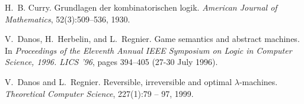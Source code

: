 \documentclass[xchauthor,chkrefs,GCNS,amsmath,amsthm,rotating,leaveRGB]{tcsg}
\theoremstyle{plain}
\theoremstyle{definition}
\begin{document}
\begin{backmatter}
\begin{thebibliography}{}
\begin{bsubitem}
\begin{bcontribution}[language=de]%
\end{bcontribution}
\begin{bhost}
\begin{bissue}
\end{bissue}
\end{bhost}
\end{bsubitem}
%
\OrigBibText
H.~B. Curry.
 Grundlagen der kombinatorischen logik.
 \emph{American Journal of Mathematics}, 52(3):509--536, 1930.
\endOrigBibText
{}%
\endbibitem

\begin{bsubitem}
\begin{bcontribution}%
\end{bcontribution}
\begin{bhost}
\begin{beditedbook}
\end{beditedbook}
\end{bhost}
\end{bsubitem}
%
\OrigBibText
V.~Danos, H.~Herbelin, and L.~Regnier.
 Game semantics and abstract machines.
 In \emph{Proceedings of the Eleventh Annual IEEE Symposium
 on Logic in Computer Science, 1996. LICS '96}, pages 394--405 (27-30 July 1996).
\endOrigBibText
{}%
\endbibitem

\begin{bsubitem}
\begin{bcontribution}%
\end{bcontribution}
\begin{bhost}
\begin{bissue}
\end{bissue}
\end{bhost}
\end{bsubitem}
%
\OrigBibText
V.~Danos and L.~Regnier.
 Reversible, irreversible and optimal $\lambda $-machines.
 \emph{Theoretical Computer Science}, 227(1):79 -- 97, 1999.
\endOrigBibText
{}%
\endbibitem


\end{thebibliography}
\end{backmatter}
\end{document}
